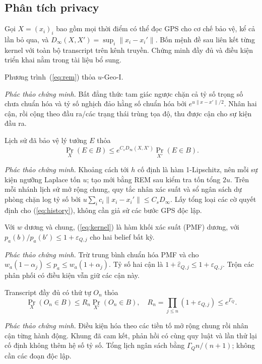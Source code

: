 \subsection{Phân tích privacy}\label{sec:privacy}
Gọi $X=(x_i)_i$ bao gồm mọi thời điểm có thể đọc GPS cho cơ chế bảo vệ, kể
cả lần bỏ qua, và $D_\infty(X,X')=\sup_i\|x_i-x_i'\|$.
Bốn mệnh đề sau liên kết từng kernel với toàn bộ transcript trên kênh truyền.
Chứng minh đầy đủ và điều kiện triển khai nằm trong tài liệu bổ sung.

\begin{proposition}\label{prop:rem}
Phương trình~(\ref{eq:rem}) thỏa $u$-Geo-I.
\end{proposition}
\noindent\emph{Phác thảo chứng minh.}
Bất đẳng thức tam giác ngược chặn cả tỷ số trọng số chưa chuẩn hóa và tỷ số
nghịch đảo hằng số chuẩn hóa bởi $e^{u\|x-x'\|/2}$.
Nhân hai cận, rồi cộng theo đầu ra/các trạng thái trùng tọa độ, thu được cận
cho sự kiện đầu ra.

\begin{proposition}\label{prop:history}
Lịch sử đã bảo vệ lý tưởng $E$ thỏa
\begin{equation}
\Pr_X(E\in B)\le e^{C_sD_\infty(X,X')}\Pr_{X'}(E\in B). \label{eq:history}
\end{equation}
\end{proposition}
\noindent\emph{Phác thảo chứng minh.}
Khoảng cách tới $h$ cố định là hàm 1-Lipschitz, nên mỗi sự kiện ngưỡng
Laplace tốn $u$; tạo mới bằng REM sau kiểm tra tốn tổng $2u$.
Trên mỗi nhánh lịch sử mở rộng chung, quy tắc nhân xác suất và sổ ngân sách
dự phòng chặn log tỷ số bởi
$u\sum_i c_i\|x_i-x_i'\|\le C_sD_\infty$.
Lấy tổng loại các cờ quyết định cho (\ref{eq:history}), không cần giả sử
các bước GPS độc lập.

\begin{proposition}\label{prop:kernel}
Với $w$ dương và chung, (\ref{eq:kernel}) là hàm khối xác suất (PMF) dương,
với $p_a(b)/p_a(b')\le1+\varepsilon_{Q,j}$ cho hai belief bất kỳ.
\end{proposition}
\noindent\emph{Phác thảo chứng minh.}
Trừ trung bình chuẩn hóa PMF và cho
$w_a(1-\alpha_j)\le p_a\le w_a(1+\alpha_j)$.
Tỷ số hai cận là $1+\widehat\varepsilon_{Q,j}\le1+\varepsilon_{Q,j}$.
Trộn các phân phối có điều kiện vẫn giữ các cận này.

\begin{proposition}\label{prop:segments}
Transcript đầy đủ có thứ tự $O_n$ thỏa
\begin{equation}
\Pr_X(O_n\in B)\le R_n\Pr_{X'}(O_n\in B),\quad
R_n=\prod_{j\le n}(1+\varepsilon_{Q,j})\le e^{\Gamma_Q}. \label{eq:segments}
\end{equation}
\end{proposition}
\noindent\emph{Phác thảo chứng minh.}
Điều kiện hóa theo các tiền tố mở rộng chung rồi nhân cận từng hành động.
Khung đã cam kết, phản hồi có cùng quy luật và lần thử lại cố định không
thêm hệ số tỷ số. Tổng lịch ngân sách bằng $\Gamma_Qn/(n+1)$; không cần
các đoạn độc lập.

